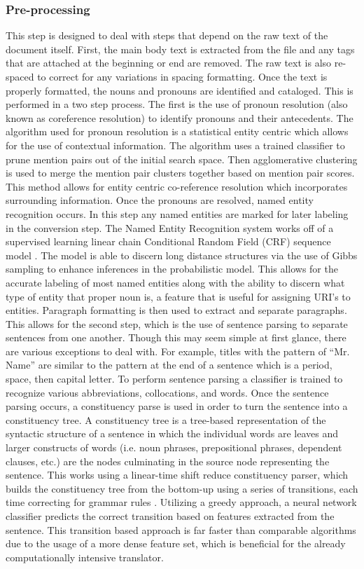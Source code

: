 \documentclass[12pt]{article}
\begin{document}
	\subsubsection{Pre-processing} 
	\quad This step is designed to deal with steps that depend on the raw text of the document itself. First, the main body text is extracted from the file and any tags that are attached at the beginning or end are removed. The raw text is also re-spaced to correct for any variations in spacing formatting. Once the text is properly formatted, the nouns and pronouns are identified and cataloged. This is performed in a two step process. 
	The first is the use of pronoun resolution (also known as coreference resolution) to identify pronouns and their antecedents. The algorithm used for pronoun resolution is a statistical entity centric which allows for the use of contextual information. \cite{clark2015entity} The algorithm uses a trained classifier to prune mention pairs out of the initial search space. Then agglomerative clustering is used to merge the mention pair clusters together based on mention pair scores. This method allows for entity centric co-reference resolution which incorporates surrounding information.
	Once the pronouns are resolved, named entity recognition occurs. In this step any named entities are marked for later labeling in the conversion step. The Named Entity Recognition system works off of a supervised learning linear chain Conditional Random Field (CRF) sequence model \cite{finkel2005incorporating}. The model is able to discern long distance structures via the use of Gibbs sampling to enhance inferences in the probabilistic model. This allows for the accurate labeling of most named entities along with the ability to discern what type of entity that proper noun is, a feature that is useful for assigning URI’s to entities. 
	Paragraph formatting is then used to extract and separate paragraphs. This allows for the second step, which is the use of sentence parsing to separate sentences from one another. Though this may seem simple at first glance, there are various exceptions to deal with. For example, titles with the pattern of “Mr. Name” are similar to the pattern at the end of a sentence which is a period, space, then capital letter. To perform sentence parsing a classifier is trained to recognize various abbreviations, collocations, and words. 
	Once the sentence parsing occurs, a constituency parse is used in order to turn the sentence into a constituency tree. A constituency tree is a tree-based representation of the syntactic structure of a sentence in which the individual words are leaves and larger constructs of words (i.e. noun phrases, prepositional phrases, dependent clauses, etc.) are the nodes culminating in the source node representing the sentence. This works using a linear-time shift reduce constituency parser, which builds the constituency tree from the bottom-up using a series of transitions, each time correcting for grammar rules \cite{chen2014fast}. Utilizing a greedy approach, a neural network classifier predicts the correct transition based on features extracted from the sentence. This transition based approach is far faster than comparable algorithms due to the usage of a more dense feature set, which is beneficial for the already computationally intensive translator. 
\end{document}
